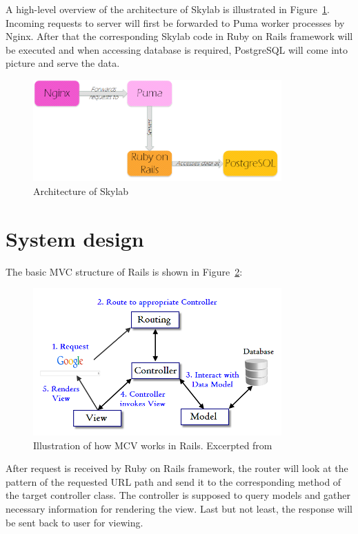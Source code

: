 A high-level overview of the architecture of Skylab is illustrated in Figure~\ref{fig:Skylabarch}. Incoming requests to server will first be forwarded to Puma worker processes by Nginx. After that the corresponding Skylab code in Ruby on Rails framework will be executed and when accessing database is required, PostgreSQL will come into picture and serve the data.

\begin{figure}[h]
  \centering
  \includegraphics[width=0.85\textwidth]{Images/Skylab_Arch.png}
  \caption{Architecture of Skylab}
  \label{fig:Skylabarch}
\end{figure}

\section{System design}

The basic MVC structure of Rails is shown in Figure~\ref{fig:RailsMVC}:

\begin{figure}[h]
  \centering
  \includegraphics[width=0.85\textwidth]{Images/Rails_MVC.png}
  \caption{Illustration of how MCV works in Rails. Excerpted from \cite{citationMVC}}
  \label{fig:RailsMVC}
\end{figure}

After request is received by Ruby on Rails framework, the router will look at the pattern of the requested URL path and send it to the corresponding method of the target controller class. The controller is supposed to query models and gather necessary information for rendering the view. Last but not least, the response will be sent back to user for viewing.

